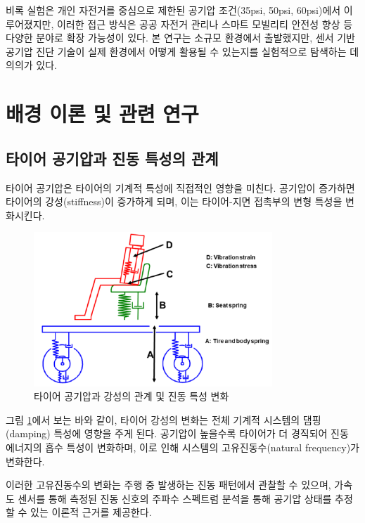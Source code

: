 \documentclass[12pt,a4paper]{article}
\begin{document}
비록 실험은 개인 자전거를 중심으로 제한된 공기압 조건(35psi, 50psi, 60psi)에서 이루어졌지만, 이러한 접근 방식은 공공 자전거 관리나 스마트 모빌리티 안전성 향상 등 다양한 분야로 확장 가능성이 있다. 본 연구는 소규모 환경에서 출발했지만, 센서 기반 공기압 진단 기술이 실제 환경에서 어떻게 활용될 수 있는지를 실험적으로 탐색하는 데 의의가 있다.

\newpage

\section{배경 이론 및 관련 연구}
\label{sec:related_work}

\subsection{타이어 공기압과 진동 특성의 관계}
\label{subsec:tire_mechanics}

타이어 공기압은 타이어의 기계적 특성에 직접적인 영향을 미친다. 공기압이 증가하면 타이어의 강성(stiffness)이 증가하게 되며, 이는 타이어-지면 접촉부의 변형 특성을 변화시킨다. 

\begin{figure}[H]
    \centering
    \includegraphics[width=0.8\textwidth]{images/근거.png}
    \caption{타이어 공기압과 강성의 관계 및 진동 특성 변화}
    \label{fig:tire_stiffness_evidence}
\end{figure}

그림 \ref{fig:tire_stiffness_evidence}에서 보는 바와 같이, 타이어 강성의 변화는 전체 기계적 시스템의 댐핑(damping) 특성에 영향을 주게 된다. 공기압이 높을수록 타이어가 더 경직되어 진동 에너지의 흡수 특성이 변화하며, 이로 인해 시스템의 고유진동수(natural frequency)가 변화한다.

이러한 고유진동수의 변화는 주행 중 발생하는 진동 패턴에서 관찰할 수 있으며, 가속도 센서를 통해 측정된 진동 신호의 주파수 스펙트럼 분석을 통해 공기압 상태를 추정할 수 있는 이론적 근거를 제공한다.
\end{document}
